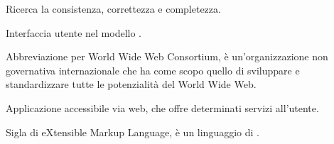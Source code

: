 Ricerca la consistenza, correttezza e completezza.

Interfaccia utente nel modello .


Abbreviazione per World Wide Web Consortium, è un'organizzazione non governativa internazionale che ha come scopo quello di sviluppare e standardizzare tutte le potenzialità del World Wide Web.

Applicazione accessibile via web, che offre determinati servizi all'utente.


Sigla di eXtensible Markup Language, è un linguaggio di .
%



